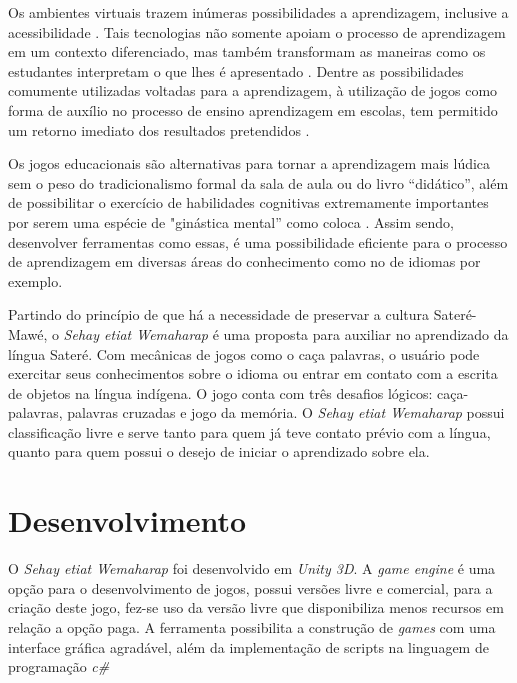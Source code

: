 \documentclass[12pt]{article}
\begin{document}
		Os ambientes virtuais trazem inúmeras possibilidades a aprendizagem, inclusive a acessibilidade \cite{kozma2003}. Tais tecnologias não somente apoiam o processo de aprendizagem em um contexto diferenciado, mas também transformam as maneiras como os estudantes interpretam o que lhes é apresentado \cite{saljo2010digital}.  Dentre as possibilidades comumente utilizadas voltadas para a aprendizagem, à utilização de jogos como forma de auxílio no processo de ensino aprendizagem em escolas, tem permitido um retorno imediato dos resultados pretendidos \cite{yamato2017amargana}. 
		
		Os jogos educacionais são alternativas para tornar a aprendizagem mais lúdica sem o peso do tradicionalismo formal da sala de aula ou do livro “didático”, além de possibilitar o exercício de habilidades cognitivas extremamente importantes por serem uma espécie de "ginástica mental” como coloca \cite{tarouco2004jogos}. Assim sendo, desenvolver ferramentas como essas, é uma possibilidade eficiente para o processo de aprendizagem em diversas áreas do conhecimento como no de idiomas por exemplo.
		
		Partindo do princípio de que há a necessidade de preservar a cultura Sateré-Mawé, o \textit{Sehay etiat Wemaharap} é uma proposta para auxiliar no aprendizado da língua Sateré. Com mecânicas de jogos como o caça palavras, o usuário pode exercitar seus conhecimentos sobre o idioma ou entrar em contato com a escrita de objetos na língua indígena. O jogo conta com três desafios lógicos: caça-palavras, palavras cruzadas e jogo da memória. O \textit{Sehay etiat Wemaharap} possui classificação livre e serve tanto para quem já teve contato prévio com a língua, quanto para quem possui o desejo de iniciar o aprendizado sobre ela.

	\section{Desenvolvimento} \label{sec:firstpage}
		O \textit{Sehay etiat Wemaharap} foi desenvolvido em \textit{Unity 3D}. A \textit{game engine} é uma opção para o desenvolvimento de jogos, possui versões livre e comercial, para a criação deste jogo, fez-se uso da versão livre que disponibiliza menos recursos em relação a opção paga. A ferramenta possibilita a construção de \textit{games} com uma interface gráfica agradável, além da implementação de scripts na linguagem de programação \textit{c#}
		
\end{document}
